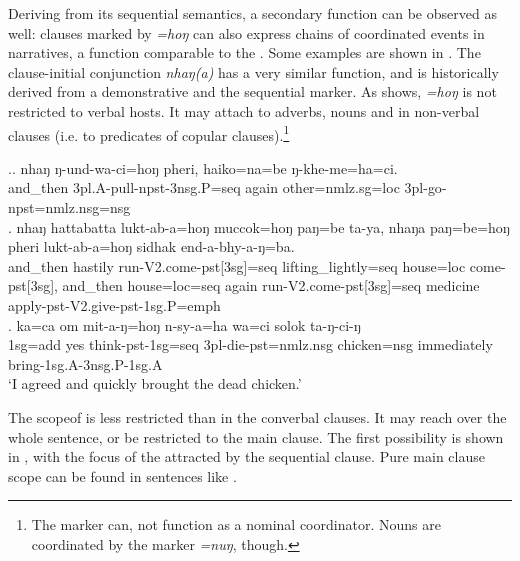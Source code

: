 	
	
Deriving from its sequential semantics, a secondary function can be observed as well: clauses marked by \emph{=hoŋ} can also express chains of coordinated events in narratives, a function comparable to the  \citep{Nedjalkov1995Some}.  Some examples are shown in \Next. The clause-initial conjunction \emph{nhaŋ(a)} has a very similar function, and is historically derived from a demonstrative and the sequential marker. As \Next[b] shows, \emph{=hoŋ} is not restricted to verbal hosts. It may attach to adverbs, nouns and  in non-verbal clauses (i.e. to predicates of copular clauses).\footnote{The marker can, not function as a nominal coordinator. Nouns are coordinated by the  marker \emph{=nuŋ}, though.}

	\ex.\ag. nhaŋ    ŋ-und-wa-ci=hoŋ                   pheri, haiko=na=be           ŋ-khe-me=ha=ci.\\
		and\_then {\sc 3pl.A-}pull{\sc -npst-3nsg.P=seq} again other{\sc =nmlz.sg=loc} {\sc 3pl-}go{\sc -npst=nmlz.nsg=nsg}\\
		 
\bg. nhaŋ hattabatta   lukt-ab-a=hoŋ muccok=hoŋ paŋ=be ta-ya, nhaŋa    paŋ=be=hoŋ pheri lukt-ab-a=hoŋ sidhak end-a-bhy-a-ŋ=ba.\\
	and\_then hastily run{\sc -V2.come-pst[3sg]=seq} lifting\_lightly{\sc =seq} house{\sc =loc} come{\sc -pst[3sg]}, and\_then house{\sc =loc=seq}  again run{\sc -V2.come-pst[3sg]=seq}  medicine apply{\sc -pst-V2.give-pst-1sg.P=emph}\\
 
\bg.	ka=ca    om  mit-a-ŋ=hoŋ       n-sy-a=ha              wa=ci             solok       ta-ŋ-ci-ŋ\\
		{\sc 1sg=add} yes think{\sc -pst-1sg=seq} {\sc 3pl-}die{\sc -pst=nmlz.nsg} chicken={\sc nsg} immediately bring{\sc [pst]-1sg.A-3nsg.P-1sg.A}\\
		‘I agreed and quickly brought the dead chicken.’ 
		

The scopeof   is less restricted than in the converbal clauses. It may reach over  the whole sentence, or be restricted to the main clause. The first possibility is shown in \Next[a], with the focus of the  attracted by the sequential clause. Pure main clause scope can be found in sentences like \Next[b]. 

